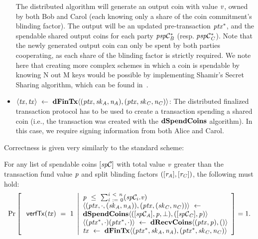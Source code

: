 \begin{definition}
\begin{itemize}
        The distributed algorithm will generate an output coin with value $\mathit{v}$, owned by both Bob and Carol (each knowing only a share of the coin commitment's blinding factor).
        The output will be an updated pre-transaction $\mathit{ptx}^*$, and the spendable shared output coins for each party $\mathit{psp}\mathcal{C}_{\mathit{B}}^*$ (resp. $\mathit{psp}\mathcal{C}_{\mathit{C}}^*$).
        Note that the newly generated output coin can only be spent by both parties cooperating, as each share of the blinding factor is strictly required.
        We note here that creating more complex schemes in which a coin is spendable by knowing N out M keys would be possible by implementing Shamir's Secret Sharing algorithm, which can be found in~\cite{shamir1979share}.
        \item $\langle \mathit{tx}, \mathit{tx} \rangle ~\leftarrow~ \mathbf{dFinTx} \langle(\mathit{ptx},\mathit{sk}_{\mathit{A}},\mathit{\mathit{n}_{\mathit{A}}}),(\mathit{ptx},\mathit{sk}_{\mathit{C}},\mathit{\mathit{n}_{\mathit{C}}})\rangle$: The distributed finalized transaction protocol has to be used to create a transaction spending a shared coin (i.e., the transaction was created with the $\mathbf{dSpendCoins}$ algorithm).
        In this case, we require signing information from both Alice and Carol.
    \end{itemize}
\end{definition}

Correctness is given very similarly to the standard scheme:

\begin{definition}
    \label{def:atom:ext-tx-scheme-correctness}
    For any list of spendable coins $[\mathit{sp}\mathcal{C}]$ with total value $\mathit{v}$ greater than the transaction fund value $\mathit{p}$ and split blinding factors $([\mathit{r}_{\mathit{A}}], [\mathit{r}_{\mathit{C}}])$, the following must hold:
    \[
        \Pr\left[
        \begin{array}{c}
            \: \mathsf{verfTx}(\mathit{tx}) ~=~ 1
        \end{array}
        \middle\vert
        \begin{array}{l}
            \mathit{p} ~\leq~ \sum_{\mathit{i} ~:=~ 0}^{\mathit{i} ~<~ \mathit{n}}(\mathit{sp}\mathcal{C}_{i}.\mathit{v}) \\
            \langle (\mathit{ptx}, \cdot, (\mathit{sk}_{\mathit{A}}, \mathit{\mathit{n}_{\mathit{A}}})), (\mathit{ptx}, (\mathit{sk}_{\mathit{C}}, \mathit{\mathit{n}_{\mathit{C}}})) \rangle ~\leftarrow~ \\
            \mathbf{dSpendCoins} \langle ([\mathit{sp}\mathcal{C}_{\mathit{A}}],\mathit{p},\bot), ([\mathit{sp}\mathcal{C}_{\mathit{C}}],\mathit{p}) \rangle \\
            \langle (\mathit{ptx}^*, \cdot)(\mathit{ptx}^*, \cdot) \rangle ~\leftarrow~ \mathbf{dRecvCoins} \langle(\mathit{ptx},\mathit{p}), () \rangle \\
            \mathit{tx} ~\leftarrow~ \mathbf{dFinTx} \langle(\mathit{ptx}^*,\mathit{sk}_{\mathit{A}},\mathit{\mathit{n}_{\mathit{A}}}),(\mathit{ptx}^*,\mathit{sk}_{\mathit{C}},\mathit{\mathit{n}_{\mathit{C}}})\rangle
        \end{array}
        \right]=1.
    \]
\end{definition}

